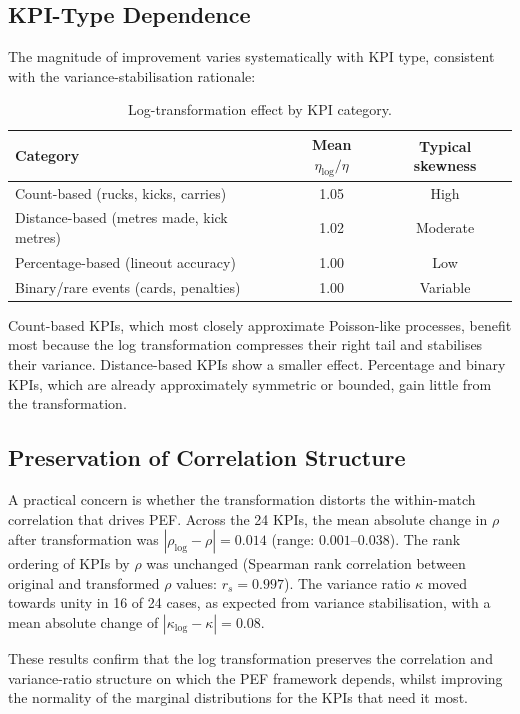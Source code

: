 \subsection{KPI-Type Dependence}

The magnitude of improvement varies systematically with KPI type, consistent with the variance-stabilisation rationale:

\begin{table}[t]
  \centering
  \caption{Log-transformation effect by KPI category.}
  \label{tab:log_category}
  \begin{tabular}{@{}lcc@{}}
    \toprule
    \textbf{Category} & \textbf{Mean $\eta_{\log}/\eta$} & \textbf{Typical skewness} \\
    \midrule
    Count-based (rucks, kicks, carries)    & 1.05 & High \\
    Distance-based (metres made, kick metres) & 1.02 & Moderate \\
    Percentage-based (lineout accuracy)    & 1.00 & Low \\
    Binary/rare events (cards, penalties)  & 1.00 & Variable \\
    \bottomrule
  \end{tabular}
\end{table}

Count-based KPIs, which most closely approximate Poisson-like processes, benefit most because the log transformation compresses their right tail and stabilises their variance. Distance-based KPIs show a smaller effect. Percentage and binary KPIs, which are already approximately symmetric or bounded, gain little from the transformation.

\subsection{Preservation of Correlation Structure}

A practical concern is whether the transformation distorts the within-match correlation that drives PEF. Across the 24 KPIs, the mean absolute change in $\rho$ after transformation was $|\rho_{\log}-\rho|=0.014$ (range: $0.001$--$0.038$). The rank ordering of KPIs by $\rho$ was unchanged (Spearman rank correlation between original and transformed $\rho$ values: $r_{s}=0.997$). The variance ratio $\kappa$ moved towards unity in 16 of 24 cases, as expected from variance stabilisation, with a mean absolute change of $|\kappa_{\log}-\kappa|=0.08$.

These results confirm that the log transformation preserves the correlation and variance-ratio structure on which the PEF framework depends, whilst improving the normality of the marginal distributions for the KPIs that need it most.


